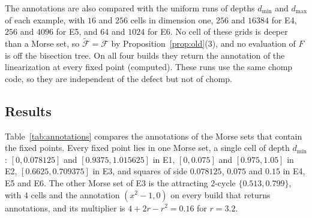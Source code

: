 \documentclass[11pt]{article}
\theoremstyle{plain}
\theoremstyle{definition}
\theoremstyle{remark}
\newcommand{\Fc}{\mathcal{F}}
\newcommand{\Ft}{\tilde{\mathcal{F}}}
\newcommand{\dmin}{d_{\min}}
\newcommand{\dmax}{d_{\max}}
\begin{document}
The annotations are also compared with the uniform runs of depths $\dmin$ and $\dmax$ of each example, with $16$ and $256$ cells in dimension one, $256$ and $16384$ for E4, $256$ and $4096$ for E5, and $64$ and $1024$ for E6. No cell of these grids is deeper than a Morse set, so $\Ft=\Fc$ by Proposition~\ref{prop:old}(3), and no evaluation of $F$ is off the bisection tree. On all four builds they return the annotation of the linearization at every fixed point (computed). These runs use the same chomp code, so they are independent of the defect but not of chomp.

\subsection{Results}\label{sec:results}

Table~\ref{tab:annotations} compares the annotations of the Morse sets that contain the fixed points. Every fixed point lies in one Morse set, a single cell of depth $\dmin$: $[0,0.078125]$ and $[0.9375,1.015625]$ in E1, $[0,0.075]$ and $[0.975,1.05]$ in E2, $[0.6625,0.709375]$ in E3, and squares of side $0.078125$, $0.075$ and $0.15$ in E4, E5 and E6. The other Morse set of E3 is the attracting $2$-cycle $\{0.513,0.799\}$, with $4$ cells and the annotation $(x^2-1,0)$ on every build that returns annotations, and its multiplier is $4+2r-r^2=0.16$ for $r=3.2$.
\end{document}
